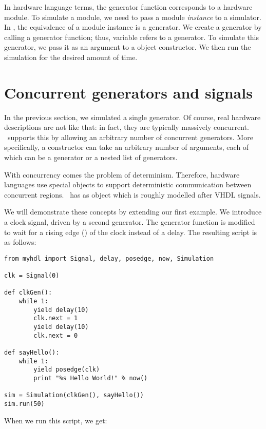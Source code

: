 In hardware language terms, the generator function corresponds to a
hardware module. To simulate a module, we need to pass a module
\emph{instance} to a simulator. In \myhdl{}, the equivalence of
a module instance is a generator. We create a generator by calling a
generator function; thus, variable  refers to a
generator. To simulate this generator, we pass it as an argument to a
 object constructor.  We then run the simulation for
the desired amount of time.

 
\section{Concurrent generators and signals}

In the previous section, we simulated a single generator. Of course,
real hardware descriptions are not like that: in fact, they are
typically massively concurrent. \myhdl\ supports this by allowing an
arbitrary number of concurrent generators. More specifically, a
 constructor can take an arbitrary number of
arguments, each of which can be a generator or a nested list of
generators.

With concurrency comes the problem of determinism. Therefore, hardware
languages use special objects to support deterministic communication
between concurrent regions. \myhdl\ has as  object which
is roughly modelled after VHDL signals.

We will demonstrate these concepts by extending our first example. We
introduce a clock signal, driven by a second generator. The
 generator function is modified to wait for a rising
edge () of the clock instead of a delay. The resulting
script is as follows:

\begin{verbatim}
from myhdl import Signal, delay, posedge, now, Simulation

clk = Signal(0)

def clkGen():
    while 1:
        yield delay(10)
        clk.next = 1
        yield delay(10)
        clk.next = 0

def sayHello():
    while 1:
        yield posedge(clk)
        print "%s Hello World!" % now()

sim = Simulation(clkGen(), sayHello())
sim.run(50)

\end{verbatim}

When we run this script, we get:

